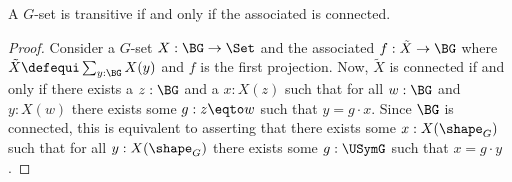 \begin{lemma}
  \label{lem:conistrans}
  A $G$-set is transitive if and only if the associated \covering is connected.
\end{lemma}
\begin{proof}
  Consider a $G$-set $X:\BG\to\Set$ and the associated \covering
  $f:\tilde X\to\BG$ where $\tilde X\defequi\sum_{y:\BG}X(y)$ and $f$
  is the first projection.  Now, $\tilde X$ is connected if and only
  if there exists a $z:\BG$ and a $x:X(z)$ such that for
  all $w:\BG$ and $y:X(w)$ there exists some $g:z\eqto w$ such that $y=g\cdot x$.
  Since $\BG$ is connected, this is equivalent to asserting that there
  exists some $x:X(\shape_G)$ such that for all $y:X(\shape_G)$ there exists
  some $g:\USymG$ such that $x=g\cdot y$.
\end{proof}

